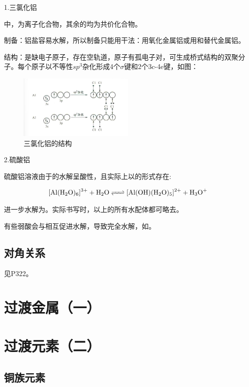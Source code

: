 \documentclass[a4paper,UTF8]{article}
\begin{document}
1.三氯化铝

中，为离子化合物，其余的均为共价化合物。

制备：铝盐容易水解，所以制备只能用干法：用氧化金属铝或用和替代金属铝。

结构：是缺电子原子，存在空轨道，原子有孤电子对，可生成桥式结构的双聚分子。每个原子以不等性$sp^3$杂化形成4个$\sigma$键和2个3c-4e键，如图：

\begin{figure}[htpb]
	\centering
	\includegraphics[width=0.5\textwidth]{figure//AlCl3的结构.png}
	\caption{三氯化铝的结构}
	\label{fig:}
\end{figure}

2.硫酸铝

硫酸铝溶液由于的水解呈酸性，且实际上以的形式存在:

$$ \ce{[Al(H2O)6]^3+ + H2O <=> [Al(OH)(H2O)5]^2+ + H3O+} $$

进一步水解为。实际书写时，以上的所有水配体都可略去。

有些弱酸会与相互促进水解，导致完全水解，如。

\subsection{对角关系}

见P322。

\section{过渡金属（一）}




\section{过渡元素（二）}

\subsection{铜族元素}
\end{document}

